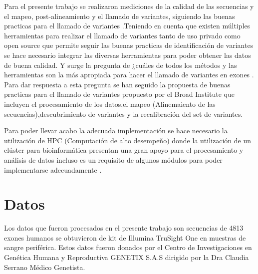 Para el presente trabajo se realizaron mediciones de la calidad de las secuencias y el mapeo, post-alineamiento y el llamado de variantes, siguiendo las buenas practicas para el llamado de variantes \cite{Fisch2015}.Teniendo en cuenta que existen múltiples herramientas para realizar el llamado de variantes tanto de uso privado como open source que permite  seguir las buenas practicas de identificación de variantes se hace necesario integrar las diversas herramientas para poder obtener las datos de buena calidad. Y surge la pregunta de ¿cuáles de todos los métodos y las herramientas son la más apropiada para hacer el llamado de variantes en exones \cite{Bao2014}\cite{Cornish2015}.\\

Para dar respuesta a esta pregunta se han seguido la propuesta de buenas practicas para el llamado de variantes propuesto por el Broad Institute que incluyen el procesamiento de los datos,el mapeo (Alinemaiento de las secuencias),descubrimiento de variantes y la recalibración del set de variantes.

Para poder llevar acabo la adecuada implementación se hace necesario la utilización de HPC (Computación de alto desempeño) donde la utilización de un clúster para bioinformática presentan una gran apoyo para el procesamiento y análisis de datos incluso es un requisito de algunos módulos para poder implementarse adecuadamente \cite{Fisch2015}.

\section{Datos}

Los datos que fueron procesados en el presente trabajo son secuencias de 4813 exones humanos se obtuvieron de kit de Illumina TruSight One en muestras de sangre periférica. Estos datos  fueron donados por el Centro de Investigaciones en Genética Humana y Reproductiva GENETIX S.A.S dirigido por la Dra Claudia Serrano Médico Genetista. \\

